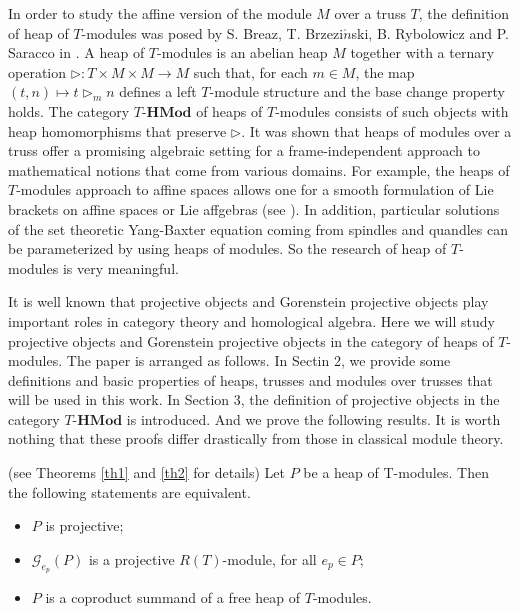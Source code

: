 \documentclass[11pt, twoside]{article}
\begin{document}
In order to study the affine version of the module $M$ over a truss $T$, the definition of heap of $T$-modules was posed by S. Breaz, T. Brzezi$\acute{n}$ski, B. Rybolowicz and P. Saracco in \cite{stbp,mb}. A heap of $T$-modules is an abelian heap $M$ together with a ternary operation $\rhd:T \times M \times M \rightarrow M$ such that, for each $m\in M$, the map $(t,n)\mapsto t\rhd_{m}n$ defines a left $T$-module structure and the base change property holds. The category $T\textbf{-HMod}$ of heaps of $T$-modules consists of such objects with heap homomorphisms that preserve $\rhd$. It was shown that heaps of modules over a truss
offer a promising algebraic setting for a frame-independent approach to mathematical notions that come
from various domains. For example, the heaps of $T$-modules approach to affine spaces allows one for a smooth formulation of Lie brackets on affine spaces or Lie affgebras (see
\cite{tb2,ggu}). In addition, particular solutions of the set theoretic Yang-Baxter equation coming from spindles and quandles can be parameterized by using heaps of modules. So the research of heap of $T$-modules is very meaningful.

It is well known that projective objects and Gorenstein projective objects play important roles in category theory and homological algebra. Here we will study projective objects and Gorenstein projective objects in the category of heaps of $T$-modules. The paper is arranged as follows. In Sectin 2, we provide some definitions and basic properties of heaps, trusses and modules over trusses that will be used in this work. In Section 3, the definition of projective objects in the category $T\textbf{-HMod}$ is introduced. And we prove the following results. It is worth nothing that these proofs differ drastically from those in classical module theory.

\begin{theorem}\label{main1} {\rm (see Theorems \ref{th1} and \ref{th2} for details)  Let $P$ be a heap of T-modules. Then the following statements are equivalent.
}
\begin{itemize}
\item[\rm (1)] $P$ is projective;
\item[\rm (2)] $\mathcal{G}_{e_p}(P)$ is a projective $R(T)$-module, for all $e_p\in P $;
\item[\rm (2)] $P$ is a coproduct summand of a free heap of $T$-modules.
\end{itemize}
\end{theorem}
\end{document}

